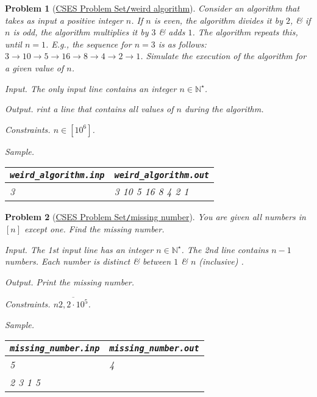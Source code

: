 \documentclass{article}
\newtheorem{problem}{Problem}
\begin{document}
\begin{problem}[\href{https://cses.fi/problemset/task/1068}{CSES Problem Set{\tt/}weird algorithm}]
    Consider an algorithm that takes as input a positive integer $n$. If $n$ is even, the algorithm divides it by $2$, \& if $n$ is odd, the algorithm multiplies it by $3$ \& adds $1$. The algorithm repeats this, until $n = 1$. E.g., the sequence for $n = 3$ is as follows: $3\to10\to5\to16\to8\to4\to2\to1$. Simulate the execution of the algorithm for a given value of $n$.
    \item {\sf Input.} The only input line contains an integer $n\in\mathbb{N}^\star$.
    \item {\sf Output.} rint a line that contains all values of $n$ during the algorithm.
    \item {\sf Constraints.} $n\in[10^6]$.
    \item {\sf Sample.}
    \begin{table}[H]
        \centering
        \begin{tabular}{|l|l|}
            \hline
            \verb|weird_algorithm.inp| & \verb|weird_algorithm.out| \\
            \hline
            3 & 3 10 5 16 8 4 2 1 \\
            \hline
        \end{tabular}
    \end{table}
\end{problem}

\begin{problem}[\href{https://cses.fi/problemset/task/1083}{CSES Problem Set{\tt/}missing number}]
    You are given all numbers in $[n]$ except one. Find the missing number.
    \item {\sf Input.} The 1st input line has an integer $n\in\mathbb{N}^\star$. The 2nd line contains $n  - 1$ numbers. Each number is distinct \& between $1$ \& $n$ (inclusive) .
    \item {\sf Output.} Print the missing number.
    \item {\sf Constraints.} $n\overline{2,2\cdot10^5}$.
    \item {\sf Sample.}
    \begin{table}[H]
        \centering
        \begin{tabular}{|l|l|}
            \hline
            \verb|missing_number.inp| & \verb|missing_number.out| \\
            \hline
            5 & 4 \\
            2 3 1 5 & \\
            \hline
        \end{tabular}
    \end{table}
\end{problem}
\end{document}
